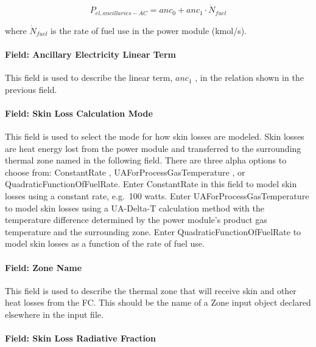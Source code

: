 \begin{equation}
{P_{el,ancillaries - AC}} = an{c_0} + an{c_1} \cdot {\dot N_{fuel}}
\end{equation}

where \({\dot N_{fuel}}\) is the rate of fuel use in the power module (kmol/s).

\paragraph{Field: Ancillary Electricity Linear Term}\label{field-ancillary-electricity-linear-term}

This field is used to describe the linear term, \(an{c_1}\) , in the relation shown in the previous field.

\paragraph{Field: Skin Loss Calculation Mode}\label{field-skin-loss-calculation-mode}

This field is used to select the mode for how skin losses are modeled. Skin losses are heat energy lost from the power module and transferred to the surrounding thermal zone named in the following field. There are three alpha options to choose from: ConstantRate , UAForProcessGasTemperature , or QuadraticFunctionOfFuelRate. Enter ConstantRate in this field to model skin losses using a constant rate, e.g.~100 watts. Enter UAForProcessGasTemperature to model skin losses using a UA-Delta-T calculation method with the temperature difference determined by the power module's product gas temperature and the surrounding zone. Enter QuadraticFunctionOfFuelRate to model skin losses as a function of the rate of fuel use.

\paragraph{Field: Zone Name}\label{field-zone-name-8-000}

This field is used to describe the thermal zone that will receive skin and other heat losses from the FC. This should be the name of a Zone input object declared elsewhere in the input file.

\paragraph{Field: Skin Loss Radiative Fraction}\label{field-skin-loss-radiative-fraction-1}

